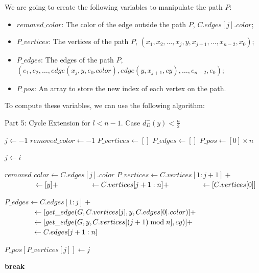 We are going to create the following variables to manipulate the path $P$:

\begin{itemize}
    \item $removed\_color$: The color of the edge outside the path $P$, $C.edges[j].color$;
    \item $P\_vertices$: The vertices of the path $P$, $(x_1, x_2, \dots, x_{j}, y, x_{j+1}, \dots, x_{n-2}, x_{0})$;
    \item $P\_edges$: The edges of the path $P$, $(e_1, e_2, \dots, edge(x_j, y, e_0.color), edge(y, x_{j+1}, cy), \dots, e_{n-2}, e_{0})$;
    \item $P\_pos$: An array to store the new index of each vertex on the path.
\end{itemize}

To compute these variables, we can use the following algorithm:
\begin{algorithm}[H]
    \caption{Part 5: Cycle Extension for \( l < n - 1 \). Case \( d^-_D(y) < \frac{n}{2} \)}
    \begin{algorithmic}[1]
            \State $j \gets -1$
            \State $removed\_color \gets -1$
            \State $P\_vertices \gets []$
            \State $P\_edges \gets []$
            \State $P\_pos \gets [0] \times n$

                        \State \Return {}
                    \EndIf

                    \State $j \gets i$

                    \State $removed\_color \gets C.edges[j].color$
                    \State $P\_vertices \gets C.vertices[1:j+1] +$
                    \State $\hspace{4.3em} \gets [y] +$
                    \State $\hspace{4.3em} \gets C.vertices[j+1:n] +$
                    \State $\hspace{4.3em} \gets [C.vertices[0]]$

                    \State $P\_edges \gets C.edges[1:j] +$
                    \State $\hspace{4.1em} \gets [get\_edge(G, C.vertices[j], y, C.edges[0].color)] +$
                    \State $\hspace{4.1em} \gets [get\_edge(G, y, C.vertices[(j + 1) \bmod n], cy)] +$
                    \State $\hspace{4.1em} \gets C.edges[j+1:n]$

                        \State $P\_pos[P\_vertices[j]] \gets j$
                    \EndFor

                    \State \textbf{break}
                \EndIf
            \EndFor
        \EndFunction
    \end{algorithmic}
\end{algorithm}

